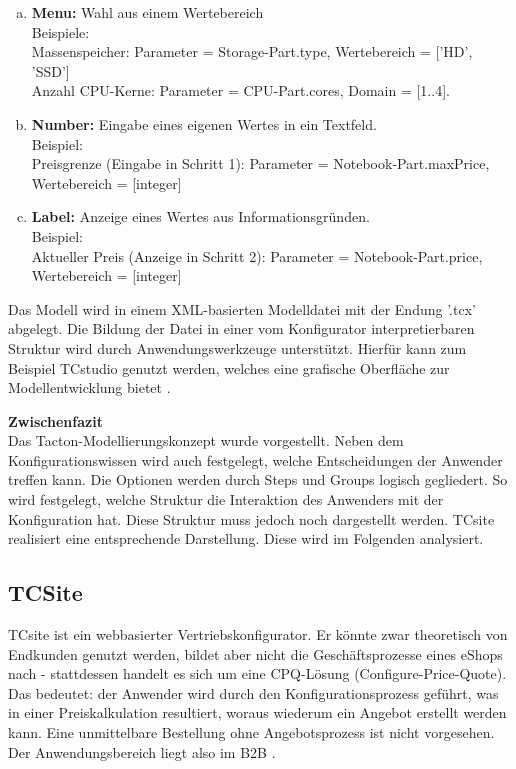 \documentclass[12pt,a4paper,bibliography=totocnumbered,listof=totoc]{scrartcl}
\begin{document}
\begin{compactitem}
\begin{enumerate}[(a)]
\item \textbf{Menu:} Wahl aus einem Wertebereich\\
Beispiele:\\
Massenspeicher: Parameter = Storage-Part.type,  Wertebereich = ['HD', 'SSD']\\
Anzahl CPU-Kerne: Parameter = CPU-Part.cores, Domain = [1..4].
\item \textbf{Number:} Eingabe eines eigenen Wertes in ein Textfeld.\\
Beispiel:\\
Preisgrenze (Eingabe in Schritt 1): Parameter = Notebook-Part.maxPrice, Wertebereich = [integer]
\item \textbf{Label:} Anzeige eines Wertes aus Informationsgründen.\\
Beispiel:\\
Aktueller Preis (Anzeige in Schritt 2): Parameter = Notebook-Part.price, Wertebereich = [integer]
\end{enumerate}
\end{compactitem}

Das Modell wird in einem XML-basierten Modelldatei mit der Endung '.tcx' abgelegt. Die Bildung der Datei in einer vom Konfigurator interpretierbaren Struktur wird durch  Anwendungswerkzeuge unterstützt. Hierfür kann zum Beispiel TCstudio genutzt werden, welches eine grafische Oberfläche zur Modellentwicklung bietet \citep{tactonAbout}.

\textbf{Zwischenfazit}\\
Das Tacton-Modellierungskonzept wurde vorgestellt. Neben dem Konfigurationswissen wird auch festgelegt, welche Entscheidungen der Anwender treffen kann. Die Optionen werden durch Steps und Groups logisch gegliedert. So wird festgelegt, welche Struktur die Interaktion des Anwenders mit der Konfiguration hat. Diese Struktur muss jedoch noch dargestellt werden. TCsite realisiert eine entsprechende Darstellung. Diese wird im Folgenden analysiert.

\subsection{TCSite}

TCsite ist ein webbasierter Vertriebskonfigurator. Er könnte zwar theoretisch von Endkunden genutzt werden, bildet aber nicht die Geschäftsprozesse eines eShops nach - stattdessen handelt es sich um eine CPQ-Lösung (Configure-Price-Quote). Das bedeutet: der Anwender wird durch den Konfigurationsprozess geführt, was in einer Preiskalkulation resultiert, woraus wiederum ein Angebot erstellt werden kann. Eine unmittelbare Bestellung ohne Angebotsprozess ist nicht vorgesehen. Der Anwendungsbereich liegt also im B2B \citep{tactonAbout}.
\end{document}
